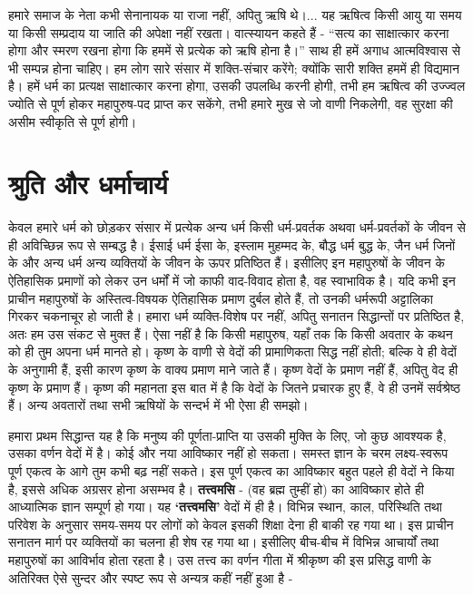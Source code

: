 हमारे समाज के नेता कभी सेनानायक या राजा नहीं, अपितु ऋषि थे।... यह ऋषित्व किसी आयु या समय या किसी सम्प्रदाय या जाति की अपेक्षा नहीं रखता। वात्स्यायन कहते हैं - “सत्य का साक्षात्कार करना होगा और स्मरण रखना होगा कि हममें से प्रत्येक को ऋषि होना है।” साथ ही हमें अगाध आत्मविश्वास से भी सम्पन्न होना चाहिए। हम लोग सारे संसार में शक्ति-संचार करेंगे; क्योंकि सारी शक्ति हममें ही विद्यमान है। हमें धर्म का प्रत्यक्ष साक्षात्कार करना होगा, उसकी उपलब्धि करनी होगी, तभी हम ऋषित्व की उज्ज्वल ज्योति से पूर्ण होकर महापुरुष-पद प्राप्त कर सकेंगे, तभी हमारे मुख से जो वाणी निकलेगी, वह सुरक्षा की असीम स्वीकृति से पूर्ण होगी।


\section*{श्रुति और धर्माचार्य}


केवल हमारे धर्म को छोड़कर संसार में प्रत्येक अन्य धर्म किसी धर्म-प्रवर्तक अथवा धर्म-प्रवर्तकों के जीवन से ही अविच्छिन्न रूप से सम्बद्ध है। ईसाई धर्म ईसा के, इस्लाम मुहम्मद के, बौद्ध धर्म बुद्ध के, जैन धर्म जिनों के और अन्य धर्म अन्य व्यक्तियों के जीवन के ऊपर प्रतिष्ठित हैं। इसीलिए इन महापुरुषों के जीवन के ऐतिहासिक प्रमाणों को लेकर उन धर्मों में जो काफी वाद-विवाद होता है, वह स्वाभाविक है। यदि कभी इन प्राचीन महापुरुषों के अस्तित्व-विषयक ऐतिहासिक प्रमाण दुर्बल होते हैं, तो उनकी धर्मरूपी अट्टालिका गिरकर चकनाचूर हो जाती है। हमारा धर्म व्यक्ति-विशेष पर नहीं, अपितु सनातन सिद्धान्तों पर प्रतिष्ठित है, अतः हम उस संकट से मुक्त हैं। ऐसा नहीं है कि किसी महापुरुष, यहाँ तक कि किसी अवतार के कथन को ही तुम अपना धर्म मानते हो। कृष्ण के वाणी से वेदों की प्रामाणिकता सिद्ध नहीं होती; बल्कि वे ही वेदों के अनुगामी हैं, इसी कारण कृष्ण के वाक्य प्रमाण माने जाते हैं। कृष्ण वेदों के प्रमाण नहीं हैं, अपितु वेद ही कृष्ण के प्रमाण हैं। कृष्ण की महानता इस बात में है कि वेदों के जितने प्रचारक हुए हैं, वे ही उनमें सर्वश्रेष्ठ हैं। अन्य अवतारों तथा सभी ऋषियों के सन्दर्भ में भी ऐसा ही समझो। 

हमारा प्रथम सिद्धान्त यह है कि मनुष्य की पूर्णता-प्राप्ति या उसकी मुक्ति के लिए, जो कुछ आवश्यक है, उसका वर्णन वेदों में है। कोई और नया आविष्कार नहीं हो सकता। समस्त ज्ञान के चरम लक्ष्य-स्वरूप पूर्ण एकत्व के आगे तुम कभी बढ़ नहीं सकते। इस पूर्ण एकत्व का आविष्कार बहुत पहले ही वेदों ने किया है, इससे अधिक अग्रसर होना असम्भव है। \textbf{तत्त्वमसि } - (वह ब्रह्म तुम्हीं हो) का आविष्कार होते ही आध्यात्मिक ज्ञान सम्पूर्ण हो गया। यह \textbf{‘तत्त्वमसि’ } वेदों में ही है। विभिन्न स्थान, काल, परिस्थिति तथा परिवेश के अनुसार समय-समय पर लोगों को केवल इसकी शिक्षा देना ही बाकी रह गया था। इस प्राचीन सनातन मार्ग पर व्यक्तियों का चलना ही शेष रह गया था। इसीलिए बीच-बीच में विभिन्न आचार्यों तथा महापुरुषों का आविर्भाव होता रहता है। उस तत्त्व का वर्णन गीता में श्रीकृष्ण की इस प्रसिद्ध वाणी के अतिरिक्त ऐसे सुन्दर और स्पष्ट रूप से अन्यत्र कहीं नहीं हुआ है -

